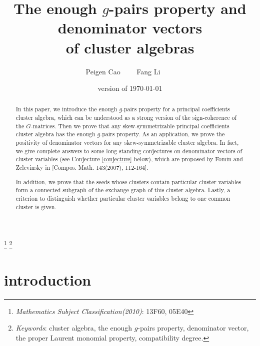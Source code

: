 \documentclass[14pt]{amsart}
\date{version of \today}
\title
[The enough $g$-pairs property and denominator vectors of cluster algebras]
{The enough $g$-pairs property and denominator vectors\\ of cluster algebras}
\author{Peigen Cao $\;\;\;\;\;\;$ Fang Li $\;\;\;\;\;\;$}
\begin{document}

\renewcommand{\thefootnote}{\alph{footnote}}

\setcounter{footnote}{-1}  \footnote{\emph{ Mathematics Subject
Classification(2010)}:  13F60, 05E40}
\renewcommand{\thefootnote}{\alph{footnote}}
\setcounter{footnote}{-1} \footnote{ \emph{Keywords}: cluster algebra, the enough $g$-pairs property, denominator vector,  the proper Laurent monomial property, compatibility degree.}


\begin{abstract} In this paper, we introduce the enough $g$-pairs property for a principal coefficients cluster algebra, which can be understood as a strong version of the sign-coherence of the $G$-matrices.  Then we prove that any skew-symmetrizable principal coefficients cluster algebra has the enough $g$-pairs property. As an application, we prove the positivity of denominator vectors for any skew-symmetrizable cluster algebra. In fact, we give  complete answers to some long standing conjectures  on denominator vectors of cluster variables (see Conjecture \ref{conjecture} below), which are proposed by Fomin and Zelevinsky in [Compos. Math. 143(2007), 112-164].

In addition, we prove that the seeds whose clusters contain particular cluster variables form a connected  subgraph of the exchange graph of this cluster algebra. Lastly, a criterion to distinguish whether particular cluster variables belong to one common cluster is given.
\end{abstract}

\maketitle
\bigskip

\section{introduction}
\end{document}
